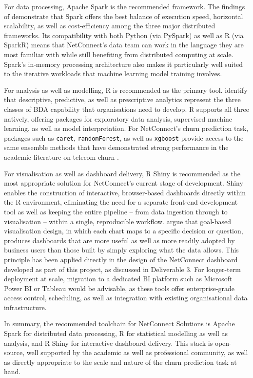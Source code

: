 \documentclass[12pt,a4paper]{article}
\begin{document}
For data processing, Apache Spark is the recommended framework. The findings of \textcite{Ullah2022} demonstrate that Spark offers the best balance of execution speed, horizontal scalability, as well as cost-efficiency among the three major distributed frameworks. Its compatibility with both Python (via PySpark) as well as R (via SparkR) means that NetConnect's data team can work in the language they are most familiar with while still benefiting from distributed computing at scale. Spark's in-memory processing architecture also makes it particularly well suited to the iterative workloads that machine learning model training involves.

For analysis as well as modelling, R is recommended as the primary tool. \textcite{Sabharwal2021} identify that descriptive, predictive, as well as prescriptive analytics represent the three classes of BDA capability that organisations need to develop. R supports all three natively, offering packages for exploratory data analysis, supervised machine learning, as well as model interpretation. For NetConnect's churn prediction task, packages such as \texttt{caret}, \texttt{randomForest}, as well as \texttt{xgboost} provide access to the same ensemble methods that have demonstrated strong performance in the academic literature on telecom churn \parencite{Sikri2024, Zhou2023}.

For visualisation as well as dashboard delivery, R Shiny is recommended as the most appropriate solution for NetConnect's current stage of development. Shiny enables the construction of interactive, browser-based dashboards directly within the R environment, eliminating the need for a separate front-end development tool as well as keeping the entire pipeline -- from data ingestion through to visualisation -- within a single, reproducible workflow. \textcite{Lavalle2024} argue that goal-based visualisation design, in which each chart maps to a specific decision or question, produces dashboards that are more useful as well as more readily adopted by business users than those built by simply exploring what the data allows. This principle has been applied directly in the design of the NetConnect dashboard developed as part of this project, as discussed in Deliverable 3. For longer-term deployment at scale, migration to a dedicated BI platform such as Microsoft Power BI or Tableau would be advisable, as these tools offer enterprise-grade access control, scheduling, as well as integration with existing organisational data infrastructure.

In summary, the recommended toolchain for NetConnect Solutions is Apache Spark for distributed data processing, R for statistical modelling as well as analysis, and R Shiny for interactive dashboard delivery. This stack is open-source, well supported by the academic as well as professional community, as well as directly appropriate to the scale and nature of the churn prediction task at hand.
\end{document}
